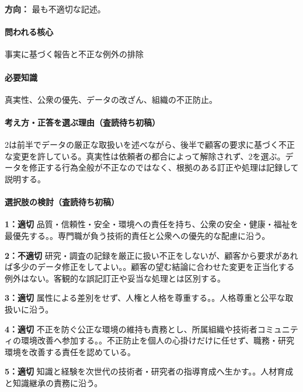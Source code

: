 \noindent\textbf{方向：} 最も不適切な記述。\par

\paragraph{問われる核心} 事実に基づく報告と不正な例外の排除

\paragraph{必要知識} 真実性、公衆の優先、データの改ざん、組織の不正防止。

\paragraph{考え方・正答を選ぶ理由（査読待ち初稿）} 2は前半でデータの厳正な取扱いを述べながら、後半で顧客の要求に基づく不正な変更を許している。真実性は依頼者の都合によって解除されず、2を選ぶ。データを修正する行為全般が不正なのではなく、根拠のある訂正や処理は記録して説明する。

\paragraph{選択肢の検討（査読待ち初稿）}\mbox{}\par

\noindent\textbf{1：適切} 品質・信頼性・安全・環境への責任を持ち、公衆の安全・健康・福祉を最優先する。。専門職が負う技術的責任と公衆への優先的な配慮に沿う。\par

\noindent\textbf{2：不適切} 研究・調査の記録を厳正に扱い不正をしないが、顧客から要求があれば多少のデータ修正をしてよい。。顧客の望む結論に合わせた変更を正当化する例外はない。客観的な誤記訂正や妥当な処理とは区別する。\par

\noindent\textbf{3：適切} 属性による差別をせず、人権と人格を尊重する。。人格尊重と公平な取扱いに沿う。\par

\noindent\textbf{4：適切} 不正を防ぐ公正な環境の維持も責務とし、所属組織や技術者コミュニティの環境改善へ参加する。。不正防止を個人の心掛けだけに任せず、職務・研究環境を改善する責任を認めている。\par

\noindent\textbf{5：適切} 知識と経験を次世代の技術者・研究者の指導育成へ生かす。。人材育成と知識継承の責務に沿う。\par

